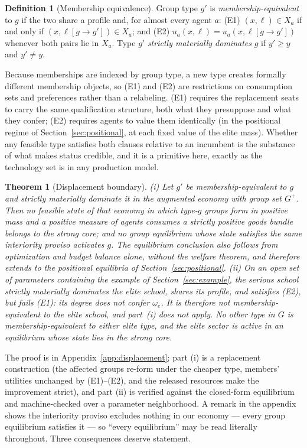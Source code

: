 \documentclass[12pt,letterpaper]{article}
\newtheorem{theorem}{Theorem}
\theoremstyle{definition}
\newtheorem{definition}{Definition}
\begin{document}
\begin{definition}[Membership equivalence]\label{def:equivalence}
Group type $g'$ is \emph{membership-equivalent} to $g$ if the two share a profile and, for almost every agent $a$:
(E1) $(x,\ell)\in X_a$ if and only if $(x,\ell[g\rightarrow g'])\in X_a$; and
(E2) $u_a(x,\ell)=u_a(x,\ell[g\rightarrow g'])$ whenever both pairs lie in $X_a$.
Type $g'$ \emph{strictly materially dominates} $g$ if $y'\geq y$ and $y'\neq y$.
\end{definition}

Because memberships are indexed by group type, a new type creates formally different membership objects, so (E1) and (E2) are restrictions on consumption sets and preferences rather than a relabeling.
(E1) requires the replacement seats to carry the same qualification structure, both what they presuppose and what they confer; (E2) requires agents to value them identically (in the positional regime of Section~\ref{sec:positional}, at each fixed value of the elite mass).
Whether any feasible type satisfies both clauses relative to an incumbent is the substance of what makes status credible, and it is a primitive here, exactly as the technology set is in any production model.

\begin{theorem}[Displacement boundary]\label{thm:displacement}
(i) Let $g'$ be membership-equivalent to $g$ and strictly materially dominate it in the augmented economy with group set $G^+$.
Then no feasible state of that economy in which type-$g$ groups form in positive mass and a positive measure of agents consumes a strictly positive goods bundle belongs to the strong core; and no group equilibrium whose state satisfies the same interiority proviso activates $g$.
The equilibrium conclusion also follows from optimization and budget balance alone, without the welfare theorem, and therefore extends to the positional equilibria of Section~\ref{sec:positional}.
(ii) On an open set of parameters containing the example of Section~\ref{sec:example}, the serious school strictly materially dominates the elite school, shares its profile, and satisfies (E2), but fails (E1): its degree does not confer $\omega_e$.
It is therefore not membership-equivalent to the elite school, and part~(i) does not apply.
No other type in $G$ is membership-equivalent to either elite type, and the elite sector is active in an equilibrium whose state lies in the strong core.
\end{theorem}

The proof is in Appendix~\ref{app:displacement}; part (i) is a replacement construction (the affected groups re-form under the cheaper type, members' utilities unchanged by (E1)--(E2), and the released resources make the improvement strict), and part (ii) is verified against the closed-form equilibrium and machine-checked over a parameter neighborhood.
A remark in the appendix shows the interiority proviso excludes nothing in our economy --- every group equilibrium satisfies it --- so ``every equilibrium'' may be read literally throughout.
Three consequences deserve statement.
\end{document}

